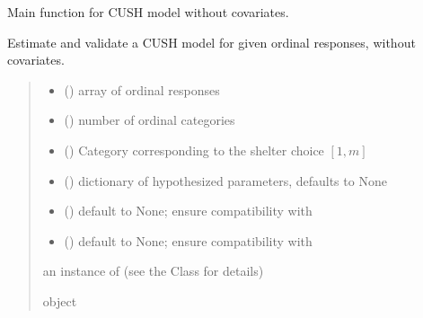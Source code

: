 \documentclass[letterpaper,10pt,english]{sphinxmanual}
\begin{document}
\begin{fulllineitems}
\label{\detokenize{cubmods:cubmods.cush.mle}}
\pysigstartsignatures
{}
\pysigstopsignatures
\sphinxAtStartPar
Main function for CUSH model without covariates.

\sphinxAtStartPar
Estimate and validate a CUSH model for given ordinal responses, without covariates.
\begin{quote}\begin{description}
\begin{itemize}
\item {} 
\sphinxAtStartPar
{} () \textendash{} array of ordinal responses

\item {} 
\sphinxAtStartPar
{} () \textendash{} number of ordinal categories

\item {} 
\sphinxAtStartPar
{} () \textendash{} Category corresponding to the shelter choice \([1,m]\)

\item {} 
\sphinxAtStartPar
{} (\sphinxstyleliteralemphasis{\sphinxupquote{, }}) \textendash{} dictionary of hypothesized parameters, defaults to None

\item {} 
\sphinxAtStartPar
{} () \textendash{} default to None; ensure compatibility with 

\item {} 
\sphinxAtStartPar
{} () \textendash{} default to None; ensure compatibility with 

\end{itemize}

\sphinxAtStartPar
an instance of  (see the Class for details)

\sphinxAtStartPar
object

\end{description}\end{quote}

\end{fulllineitems}
\end{document}
